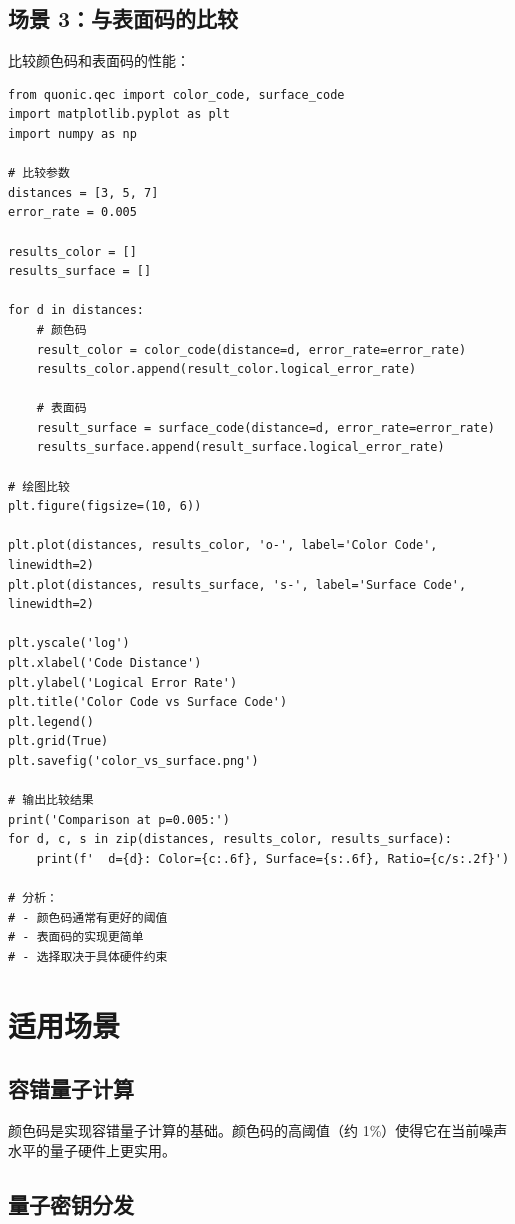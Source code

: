 \documentclass[12pt,a4paper]{article}
\begin{document}
\subsection{场景 3：与表面码的比较}

比较颜色码和表面码的性能：

\begin{verbatim}
from quonic.qec import color_code, surface_code
import matplotlib.pyplot as plt
import numpy as np

# 比较参数
distances = [3, 5, 7]
error_rate = 0.005

results_color = []
results_surface = []

for d in distances:
    # 颜色码
    result_color = color_code(distance=d, error_rate=error_rate)
    results_color.append(result_color.logical_error_rate)

    # 表面码
    result_surface = surface_code(distance=d, error_rate=error_rate)
    results_surface.append(result_surface.logical_error_rate)

# 绘图比较
plt.figure(figsize=(10, 6))

plt.plot(distances, results_color, 'o-', label='Color Code', linewidth=2)
plt.plot(distances, results_surface, 's-', label='Surface Code', linewidth=2)

plt.yscale('log')
plt.xlabel('Code Distance')
plt.ylabel('Logical Error Rate')
plt.title('Color Code vs Surface Code')
plt.legend()
plt.grid(True)
plt.savefig('color_vs_surface.png')

# 输出比较结果
print('Comparison at p=0.005:')
for d, c, s in zip(distances, results_color, results_surface):
    print(f'  d={d}: Color={c:.6f}, Surface={s:.6f}, Ratio={c/s:.2f}')

# 分析：
# - 颜色码通常有更好的阈值
# - 表面码的实现更简单
# - 选择取决于具体硬件约束
\end{verbatim}

\section{适用场景}

\subsection{容错量子计算}

颜色码是实现容错量子计算的基础。颜色码的高阈值（约 1\%）使得它在当前噪声水平的量子硬件上更实用。

\subsection{量子密钥分发}
\end{document}
